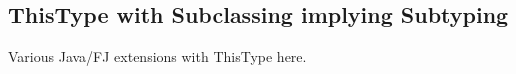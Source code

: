 


\subsection{ThisType with Subclassing implying Subtyping}

Various Java/FJ extensions with ThisType here.


